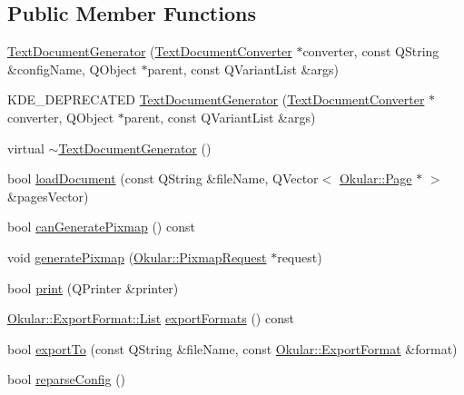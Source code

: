 \subsection*{Public Member Functions}
\begin{DoxyCompactItemize}
\item 
\hyperlink{classOkular_1_1TextDocumentGenerator_a70ca1106f9b9270ddcc5ac65e0c51744}{Text\+Document\+Generator} (\hyperlink{classOkular_1_1TextDocumentConverter}{Text\+Document\+Converter} $\ast$converter, const Q\+String \&config\+Name, Q\+Object $\ast$parent, const Q\+Variant\+List \&args)
\item 
K\+D\+E\+\_\+\+D\+E\+P\+R\+E\+C\+A\+T\+E\+D \hyperlink{classOkular_1_1TextDocumentGenerator_a68b20e4b484a9353574ce2073606f23b}{Text\+Document\+Generator} (\hyperlink{classOkular_1_1TextDocumentConverter}{Text\+Document\+Converter} $\ast$converter, Q\+Object $\ast$parent, const Q\+Variant\+List \&args)
\item 
virtual \hyperlink{classOkular_1_1TextDocumentGenerator_acf8b879716282a22ebe51e9f3f1d5d26}{$\sim$\+Text\+Document\+Generator} ()
\item 
bool \hyperlink{classOkular_1_1TextDocumentGenerator_ad8845c4dc3d820eeac91b22912ad95b5}{load\+Document} (const Q\+String \&file\+Name, Q\+Vector$<$ \hyperlink{classOkular_1_1Page}{Okular\+::\+Page} $\ast$ $>$ \&pages\+Vector)
\item 
bool \hyperlink{classOkular_1_1TextDocumentGenerator_ad630c70586245b48662fb3948bce4a2f}{can\+Generate\+Pixmap} () const 
\item 
void \hyperlink{classOkular_1_1TextDocumentGenerator_a204c621d56d41e8953c13619b032e416}{generate\+Pixmap} (\hyperlink{classOkular_1_1PixmapRequest}{Okular\+::\+Pixmap\+Request} $\ast$request)
\item 
bool \hyperlink{classOkular_1_1TextDocumentGenerator_a5692da1c8edcfaaca2459ed2beb6c834}{print} (Q\+Printer \&printer)
\item 
\hyperlink{classOkular_1_1ExportFormat_a987d72c1a1456b8a983a37603a8fa78d}{Okular\+::\+Export\+Format\+::\+List} \hyperlink{classOkular_1_1TextDocumentGenerator_a3d94162294ecc182dcc5b5d1e64fd1b1}{export\+Formats} () const 
\item 
bool \hyperlink{classOkular_1_1TextDocumentGenerator_a3b116bb8b3c28740203bdb7f0fce0e9f}{export\+To} (const Q\+String \&file\+Name, const \hyperlink{classOkular_1_1ExportFormat}{Okular\+::\+Export\+Format} \&format)
\item 
bool \hyperlink{classOkular_1_1TextDocumentGenerator_a875a07fa60e300a698a1f9278e32cd07}{reparse\+Config} ()

\end{DoxyCompactItemize}
